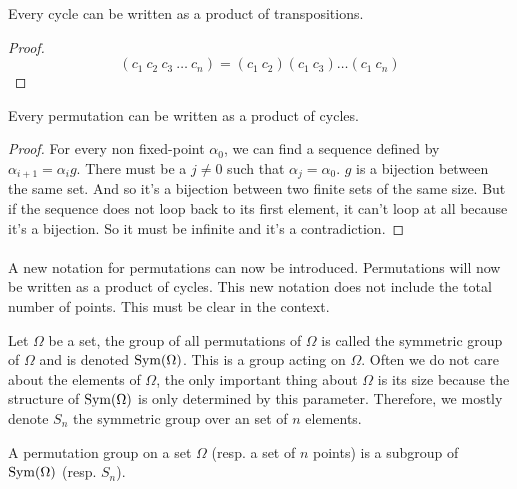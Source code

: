 \begin{proposition}
  Every cycle can be written as a product of transpositions.
\end{proposition}

\begin{proof}
  \[
    (c_1\ c_2\ c_3\ \dots\ c_n) = (c_1\ c_2)(c_1\ c_3)\dots(c_1\ c_n)
  \]
\end{proof}

\begin{proposition}
  Every permutation can be written as a product of cycles.
\end{proposition}

\begin{proof}
  For every non fixed-point $\alpha_0$, we can find a sequence defined by $\alpha_{i+1} = \alpha_i g$. There must be a $j \neq 0$ such that $\alpha_j = \alpha_0$. $g$ is a bijection between the same set. And so it's a bijection between two finite sets of the same size. But if the sequence does not loop back to its first element, it can't loop at all because it's a bijection. So it must be infinite and it's a contradiction.
\end{proof}

\paragraph{}
A new notation for permutations can now be introduced. Permutations will now be written as a product of cycles. This new notation does not include the total number of points. This must be clear in the context.

\begin{definition}
  Let $\Omega$ be a set, the group of all permutations of $\Omega$ is called the symmetric group of $\Omega$ and is denoted $\operatorname{Sym}(\Omega)$. This is a group acting on $\Omega$. Often we do not care about the elements of $\Omega$, the only important thing about $\Omega$ is its size because the structure of $\operatorname{Sym}(\Omega)$ is only determined by this parameter. Therefore, we mostly denote $S_n$ the symmetric group over an set of $n$ elements.
\end{definition}

\begin{definition}
  A permutation group on a set $\Omega$ (resp. a set of $n$ points) is a subgroup of $\operatorname{Sym}(\Omega)$ (resp. $S_n$).
\end{definition}

